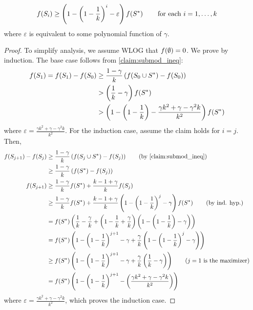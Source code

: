 \begin{claim}
    \begin{equation*}
        f \! \left( S_i \right) \geq \left( 1 - \left( 1 - \frac{1}{k} \right)^i - \varepsilon \right)f \! \left( S^{\ast} \right) \quad \quad 
        \textnormal{for each } i = 1, \ldots, k 
    \end{equation*}
    where $\varepsilon$ is equivalent to some polynomial function of $\gamma$. 
    \label{claim:submod_ineq_induction}
\end{claim}
\begin{proof}
    To simplify analysis, we assume WLOG that $f \! \left( \emptyset \right) = 0$. We prove by induction. 
    The base case follows from \cref{claim:submod_ineq}:
    \begin{align*}
        f \! \left( S_1 \right) = f \! \left( S_1 \right) - f \! \left( S_0 \right) &\geq \frac{1 - \gamma}{k} \left( f \! \left( S_0 \cup  S^{\ast} \right) - f \! \left( S_0 \right) \right) \\
        &> \left( \frac{1}{k} - \gamma \right) f \! \left( S^{\ast} \right) \\
        &> \left( 1 - \left( 1 - \frac{1}{k} \right) - \frac{\gamma k^2 + \gamma - \gamma^2 k}{k^2} \right) f \! \left( S^{\ast} \right)
    \end{align*}
    where $\varepsilon = \frac{\gamma k^2 + \gamma - \gamma^2 k}{k^2}$. For the induction case, assume the claim holds for $i = j$. Then, 
    \begin{align*}
        \f{S_{j+1}} - \f{S_j} &\geq \frac{1-\gamma}{k} \lrp{\f{S_j \cup  S^{\ast}} - \f{S_j}}
        \tag*{(by \cref{claim:submod_ineq})}\\
        &\geq \frac{1-\gamma}{k} \lrp{\f{S^{\ast}} - \f{S_j}}\\
        \f{S_{j+1}} &\geq \frac{1-\gamma}{k} \f{S^{\ast}} + \frac{k - 1 + \gamma}{k} \f{S_j}\\
        &\geq \frac{1-\gamma}{k} \f{S^{\ast}} + \frac{k-1+\gamma}{k}\lrp{1 - \lrp{1 - \frac{1}{k}}^j - \gamma} \f{S^{\ast}}
        \tag*{(by ind. hyp.)}\\ 
        &= \f{S^{\ast}} \lrp{\frac{1}{k} - \frac{\gamma}{k} + \lrp{1 - \frac{1}{k} + \frac{\gamma}{k}} \lrp{1 - \lrp{1 - \frac{1}{k}} - \gamma}} \\
        &= \f{S^{\ast}} \lrp{1 - \lrp{1 - \frac{1}{k}}^{j+1} -\gamma + \frac{\gamma}{k} \lrp{1 - \lrp{1 - \frac{1}{k}}^j - \gamma}} 
        \\
        &\geq \f{S^{\ast}} \lrp{1 - \lrp{1 - \frac{1}{k}}^{j+1} -\gamma + \frac{\gamma}{k} \lrp{\frac{1}{k} - \gamma}} 
        \tag*{($j = 1$ is the maximizer)}\\
        &= \f{S^{\ast}} \lrp{1 - \lrp{1 - \frac{1}{k}}^{j+1} - \lrp{\frac{\gamma k^2 + \gamma - \gamma^2 k}{k^2}}}
    \end{align*} 
    where $\varepsilon = \frac{\gamma k^2 + \gamma - \gamma^2 k}{k^2}$, which proves the induction case. 
\end{proof}

